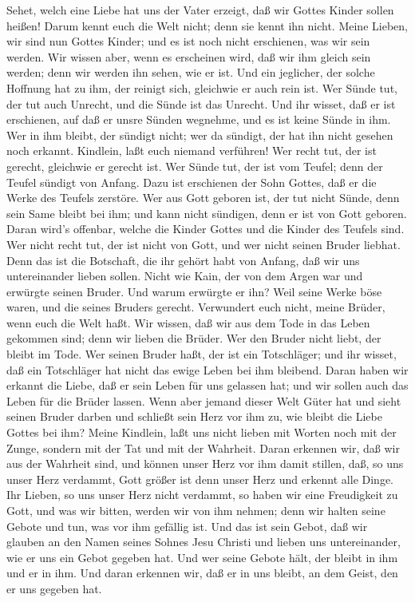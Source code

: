  Sehet, welch eine Liebe hat uns der Vater erzeigt, daß wir
Gottes Kinder sollen heißen! Darum kennt euch die Welt nicht; denn sie
kennt ihn nicht.  Meine Lieben, wir sind nun Gottes Kinder;
und es ist noch nicht erschienen, was wir sein werden. Wir wissen aber,
wenn es erscheinen wird, daß wir ihm gleich sein werden; denn wir werden
ihn sehen, wie er ist.  Und ein jeglicher, der solche
Hoffnung hat zu ihm, der reinigt sich, gleichwie er auch rein ist.
 Wer Sünde tut, der tut auch Unrecht, und die Sünde ist das
Unrecht.  Und ihr wisset, daß er ist erschienen, auf daß er
unsre Sünden wegnehme, und es ist keine Sünde in ihm.  Wer
in ihm bleibt, der sündigt nicht; wer da sündigt, der hat ihn nicht
gesehen noch erkannt.  Kindlein, laßt euch niemand
verführen! Wer recht tut, der ist gerecht, gleichwie er gerecht ist.
 Wer Sünde tut, der ist vom Teufel; denn der Teufel sündigt
von Anfang. Dazu ist erschienen der Sohn Gottes, daß er die Werke des
Teufels zerstöre.  Wer aus Gott geboren ist, der tut nicht
Sünde, denn sein Same bleibt bei ihm; und kann nicht sündigen, denn er
ist von Gott geboren.  Daran wird's offenbar, welche die
Kinder Gottes und die Kinder des Teufels sind. Wer nicht recht tut, der
ist nicht von Gott, und wer nicht seinen Bruder liebhat. 
Denn das ist die Botschaft, die ihr gehört habt von Anfang, daß wir uns
untereinander lieben sollen.  Nicht wie Kain, der von dem
Argen war und erwürgte seinen Bruder. Und warum erwürgte er ihn? Weil
seine Werke böse waren, und die seines Bruders gerecht. 
Verwundert euch nicht, meine Brüder, wenn euch die Welt haßt.
 Wir wissen, daß wir aus dem Tode in das Leben gekommen
sind; denn wir lieben die Brüder. Wer den Bruder nicht liebt, der bleibt
im Tode.  Wer seinen Bruder haßt, der ist ein Totschläger;
und ihr wisset, daß ein Totschläger hat nicht das ewige Leben bei ihm
bleibend.  Daran haben wir erkannt die Liebe, daß er sein
Leben für uns gelassen hat; und wir sollen auch das Leben für die Brüder
lassen.  Wenn aber jemand dieser Welt Güter hat und sieht
seinen Bruder darben und schließt sein Herz vor ihm zu, wie bleibt die
Liebe Gottes bei ihm?  Meine Kindlein, laßt uns nicht
lieben mit Worten noch mit der Zunge, sondern mit der Tat und mit der
Wahrheit.  Daran erkennen wir, daß wir aus der Wahrheit
sind, und können unser Herz vor ihm damit stillen,  daß, so
uns unser Herz verdammt, Gott größer ist denn unser Herz und erkennt
alle Dinge.  Ihr Lieben, so uns unser Herz nicht verdammt,
so haben wir eine Freudigkeit zu Gott,  und was wir bitten,
werden wir von ihm nehmen; denn wir halten seine Gebote und tun, was vor
ihm gefällig ist.  Und das ist sein Gebot, daß wir glauben
an den Namen seines Sohnes Jesu Christi und lieben uns untereinander,
wie er uns ein Gebot gegeben hat.  Und wer seine Gebote
hält, der bleibt in ihm und er in ihm. Und daran erkennen wir, daß er in
uns bleibt, an dem Geist, den er uns gegeben hat.

